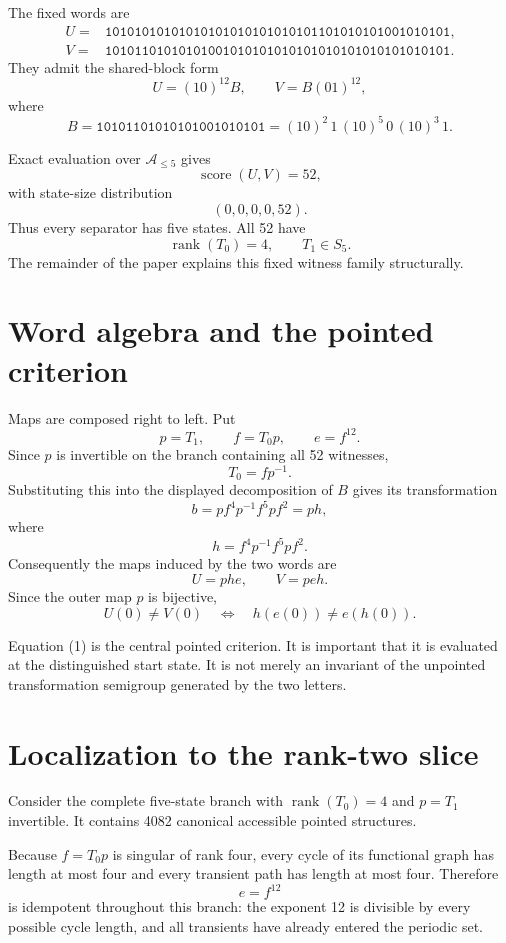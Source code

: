 \documentclass[10pt]{article}
\newcommand{\score}{\operatorname{score}}
\newcommand{\rank}{\operatorname{rank}}
\begin{document}
The fixed words are
\begin{align*}
U={}&\texttt{10101010101010101010101010101101010101001010101},\\
V={}&\texttt{10101101010101001010101010101010101010101010101}.
\end{align*}
They admit the shared-block form
\[
U=(10)^{12}B,\qquad V=B(01)^{12},
\]
where
\[
B=\texttt{10101101010101001010101}
=(10)^2\,1\,(10)^5\,0\,(10)^3\,1.
\]

Exact evaluation over $\mathcal A_{\leq5}$ gives
\[
\score(U,V)=52,
\]
with state-size distribution
\[
(0,0,0,0,52).
\]
Thus every separator has five states. All 52 have
\[
\rank(T_0)=4,\qquad T_1\in S_5.
\]
The remainder of the paper explains this fixed witness family structurally.

\section{Word algebra and the pointed criterion}

Maps are composed right to left. Put
\[
p=T_1,\qquad f=T_0p,\qquad e=f^{12}.
\]
Since $p$ is invertible on the branch containing all 52 witnesses,
\[
T_0=fp^{-1}.
\]
Substituting this into the displayed decomposition of $B$ gives its transformation
\[
b=pf^4p^{-1}f^5pf^2=ph,
\]
where
\[
h=f^4p^{-1}f^5pf^2.
\]
Consequently the maps induced by the two words are
\[
U=phe,\qquad V=peh.
\]
Since the outer map $p$ is bijective,
\begin{equation}
U(0)\neq V(0)
\quad\Longleftrightarrow\quad
h(e(0))\neq e(h(0)).
\tag{1}
\end{equation}

Equation (1) is the central pointed criterion. It is important that it is evaluated at the distinguished start state. It is not merely an invariant of the unpointed transformation semigroup generated by the two letters.

\section{Localization to the rank-two slice}

Consider the complete five-state branch with $\rank(T_0)=4$ and $p=T_1$ invertible. It contains 4082 canonical accessible pointed structures.

Because $f=T_0p$ is singular of rank four, every cycle of its functional graph has length at most four and every transient path has length at most four. Therefore
\[
e=f^{12}
\]
is idempotent throughout this branch: the exponent 12 is divisible by every possible cycle length, and all transients have already entered the periodic set.
\end{document}
